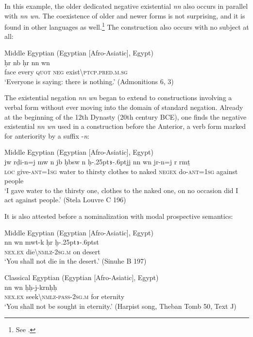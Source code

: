 \documentclass[output=paper]{langsci/langscibook}
\newcommand{\ꜥ}{ʿ}
\newcommand{\ꜣ}{\kern-.25pt\texttt{ꜣ}\kern-.6pt}
\begin{document}
In this example, the older dedicated negative existential \textit{nn} also occurs in parallel with \textit{nn wn}. The coexistence of older and newer forms is not surprising, and it is found in other languages as well.\footnote{See \citet{Veselinova2014}.} 
The construction also occurs with no subject at all:  
 
\ea Middle Egyptian (Egyptian [Afro-Asiatic], Egypt) \label{ex:AE40}\\
    \gll ḥr nb ḥr nn wn\\
    face every \textsc{quot} \textsc{neg} exist\textbackslash\textsc{ptcp.pred.m.sg}\\ 
    \glt ‘Everyone is saying: there is nothing.’ (Admonitions 6, 3)
\z 
 
The existential negation \textit{nn wn} began to extend to constructions involving a verbal form without ever moving into the domain of standard negation. Already at the beginning of the 12th Dynasty (20th century BCE), one finds the negative existential \textit{nn wn} used in a construction before the Anterior, a verb form marked for anteriority by a suffix -\textit{n}:  
 
\ea Middle Egyptian (Egyptian [Afro-Asiatic], Egypt) \label{ex:AE41}\\
    \gll jw rḏi-n=j mw n jb ḥbsw n ḥ{\ꜣ}jj nn wn jr-n=j r rmṯ\\
    \textsc{loc} give-\textsc{ant=1sg} water to thirsty clothes to naked \textsc{negex} do-\textsc{ant=1sg} against people\\ 
    \glt ‘I gave water to the thirsty one, clothes to the naked one, on no occasion did I act against people.’ (Stela Louvre C 196) 
\z 
 
It is also attested before a nominalization with modal prospective semantics: 
 
\ea Middle Egyptian (Egyptian [Afro-Asiatic], Egypt) \label{ex:AE42}\\
    \gll nn wn mwt-k ḥr ḫ{\ꜣ}st\\
    \textsc{nex.ex} die\textbackslash\textsc{nmlz-2sg.m} on desert\\ 
    \glt ‘You shall not die in the desert.’ (Sinuhe B 197) 
\z 

\ea Classical Egyptian (Egyptian [Afro-Asiatic], Egypt) \label{ex:AE43}\\
    \gll nn wn ḥḥ-j-krnḥḥ\\
    \textsc{nex.ex} seek\textbackslash\textsc{nmlz-pass-2sg.m} for eternity\\ 
    \glt ‘You shall not be sought in eternity.’ (Harpist song, Theban Tomb 50, Text J)
\z 
 
\end{document}

